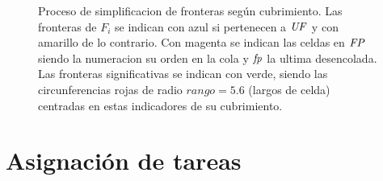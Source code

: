 \begin{figure}[H]

  \caption[Proceso de simplificacion de fronteras según cubrimiento.]{Proceso
    de simplificacion de fronteras según cubrimiento.  Las fronteras de
    $F_i$ se indican con azul si pertenecen a $\mathit{UF}$ y con amarillo de lo
    contrario. Con magenta se indican las celdas en $\mathit{FP}$ siendo la
  numeracion su orden en la cola y $\mathit{fp}$ la ultima desencolada. Las fronteras significativas se indican con
verde, siendo las circunferencias rojas de radio $rango=5.6$ (largos de celda) centradas en estas indicadores de su cubrimiento.}\label{fig:ejemploFSCub}

\end{figure}


\section{Asignación de tareas}\label{sec:asigTar}

